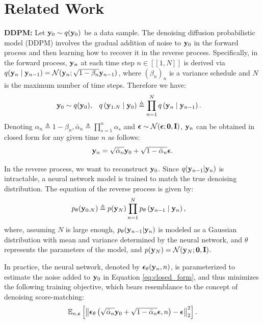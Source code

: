 \section{Related Work}\label{sec:background}

\textbf{DDPM:} Let $\mathbf{y}_0 \sim q(\mathbf{y}_0)$ be a data sample. The denoising diffusion probabilistic model (DDPM) \cite{ho2020denoising} involves the gradual addition of noise to $\mathbf{y}_0$ in the forward process and then learning how to recover it in the reverse process. Specifically, in the forward process, $\mathbf{y}_n$ at each time step $n \in \![\![1, N\!]\!]$ is derived via $q(\mathbf{y}_n\mid \mathbf{y}_{n-1})=\mathcal{N}(\mathbf{y}_n; \sqrt{1-\beta_{n}} \mathbf{y}_{n-1})$, where $(\beta_n)_n$ is a variance schedule and $N$ is the maximum number of time steps. Therefore we have:
\begin{align}
\label{eqn:diff_proc_forward}
\mathbf{y}_0 \sim q (\mathbf{y}_0), \quad &q\left(\mathbf{y}_{1:N} \mid \mathbf{y}_0\right) \triangleq \prod_{n=1}^{N}q\left(\mathbf{y}_n\mid \mathbf{y}_{n-1}\right).
\end{align}
Denoting $\alpha_n\triangleq 1-\beta_n, \bar{\alpha}_n\triangleq\prod_{s=1}^n \alpha_s$ and ${\boldsymbol{\epsilon}} \sim \mathcal{N}(\boldsymbol{\epsilon};\mathbf{0}, \mathbf{I})$, $\mathbf{y}_n$ can be obtained in closed form for any given time $n$ as follows:
\begin{equation}
\label{eq:closed_form}
    \mathbf{y}_n=\sqrt{\bar{\alpha}_n} \mathbf{y}_0+\sqrt{1-\bar{\alpha}_n} {\boldsymbol{\epsilon}}.
\end{equation} 

In the reverse process, we want to reconstruct $\mathbf{y}_0$. Since $q(\mathbf{y}_{n-1}|\mathbf{y}_{n})$ is intractable, a neural network model is trained to match the true denoising distribution. The equation of the reverse process is given by:
\begin{align}
\label{eqn:diff_proc_reverse}
p_{\theta}(\mathbf{y}_{0:N})\triangleq p(\mathbf{y}_N)\prod_{n=1}^{N}p_\theta\left(\mathbf{y}_{n-1}\mid \mathbf{y}_{n}\right), \quad 
\end{align}
where, assuming $N$ is large enough, $p_{\theta}(\mathbf{y}_{n-1} | \mathbf{y}_{n})$ is modeled as a Gaussian distribution with mean and variance determined by the neural network, and $\theta$ represents the parameters of the model, and $p(\mathbf{y}_N) = \mathcal{N}(\mathbf{y}_N; \mathbf{0}, \mathbf{I})$.

In practice, the neural network, denoted by $\boldsymbol{\epsilon}_\theta(\mathbf{y}_n, n)$, is parameterized to estimate the noise added to $\mathbf{y}_0$ in Equation \ref{eq:closed_form}, and thus minimizes the following training objective, which bears resemblance to the concept of denoising score-matching:
\begin{equation}
    \mathbb{E}_{n, \boldsymbol{\epsilon}}\left[\left\|\boldsymbol{\epsilon}_\theta\left(\sqrt{\bar{\alpha}_n} \mathbf{y}_0+\sqrt{1-\bar{\alpha}_n} \boldsymbol{\epsilon}, n\right)-\boldsymbol{\epsilon}\right\|_2^2\right]. \label{eq:diff_model}
\end{equation}

